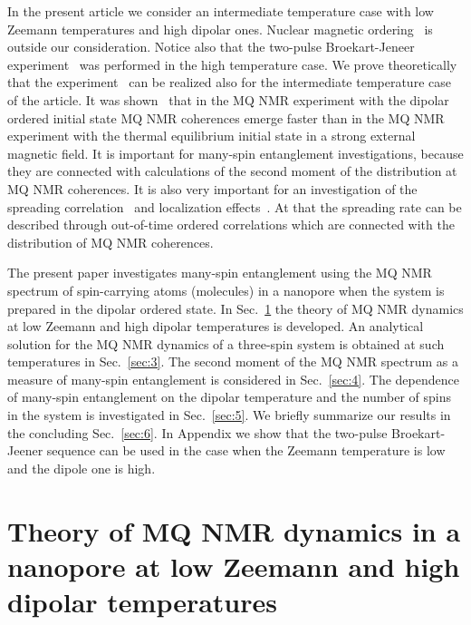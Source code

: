 \documentclass[review]{elsarticle}
\begin{document}
In the present article we consider an intermediate temperature case with low Zeemann temperatures and high dipolar ones. 
Nuclear magnetic ordering~\cite{Abragam_1982} is outside our consideration.
Notice also that the two-pulse Broekart-Jeneer experiment~\cite{Jeener_1967} was performed in the high temperature case.
We prove theoretically that the experiment~\cite{Jeener_1967} can be realized also for the intermediate temperature case of the article. 
It was shown~\cite{Doronin_2011} that in the MQ NMR experiment with the dipolar ordered initial state MQ NMR coherences emerge faster 
than in the MQ NMR experiment with the thermal equilibrium initial state in a strong external magnetic field.
It is important for many-spin entanglement investigations, because they are connected with calculations of the second moment of the distribution at MQ NMR coherences. 
It is also very important for an investigation of the spreading correlation~\cite{Baugh_2001,Baum_1986,S_nchez_2014,Munowitz_1987} and localization effects~\cite{Alvarez_2015,Wei_2018}.
At that the spreading rate can be described through out-of-time ordered correlations which are connected with the distribution of MQ NMR coherences. 

The present paper investigates many-spin entanglement using the MQ NMR spectrum of spin-carrying atoms (molecules) in a nanopore when the system is prepared in the dipolar ordered state.
In Sec.~\ref{sec:2} the theory of MQ NMR dynamics at low Zeemann and high dipolar temperatures is developed.
An analytical solution for the MQ NMR dynamics of a three-spin system is obtained at such temperatures in Sec.~\ref{sec:3}.
The second moment of the MQ NMR spectrum as a measure of many-spin entanglement is considered in Sec.~\ref{sec:4}.
The dependence of many-spin entanglement on the dipolar temperature and the number of spins in the system is investigated in Sec.~\ref{sec:5}.
We briefly summarize our results in the concluding Sec.~\ref{sec:6}.
In Appendix we show that the two-pulse Broekart-Jeener sequence can be used in the case when the Zeemann temperature is low and the dipole one is high.



\section{Theory of MQ NMR dynamics in a nanopore at low Zeemann and high dipolar temperatures}
\label{sec:2}
\end{document}
